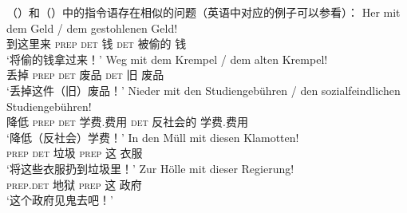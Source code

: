 \begin{exe}
\begin{xlist}[iv.]
\begin{exe}
\begin{xlist}[iv.]
（）和（）中的指令语存在相似的问题（英语中对应的例子可以参看）：
\eal
\label{Beispiel-Direktiva}
\ex 
\gll Her  mit  dem Geld   / dem gestohlenen Geld!\\
     到这里来 \textsc{prep} \textsc{det} 钱 {} \textsc{det} 被偷的 钱\\
\glt `将偷的钱拿过来！'
\ex 
\gll Weg  mit  dem Krempel / dem alten Krempel!\\
     丢掉 \textsc{prep} \textsc{det} 废品   {} \textsc{det} 旧 废品\\
\glt `丢掉这件（旧）废品！'
\ex 
\gll Nieder mit den Studiengebühren / den sozialfeindlichen Studiengebühren!\\
     降低 \textsc{prep} \textsc{det} 学费.费用  {} \textsc{det} 反社会的 学费.费用\\
\glt `降低（反社会）学费！'
\zl
\eal
\ex 
\gll In den Müll mit diesen Klamotten!\\
     \textsc{prep} \textsc{det} 垃圾 \textsc{prep} 这 衣服\\
\glt `将这些衣服扔到垃圾里！'
\ex 
\gll Zur Hölle mit dieser Regierung!\\
	 \textsc{prep}.\textsc{det} 地狱 \textsc{prep} 这 政府\\
\glt `这个政府见鬼去吧！'

\end{xlist}
\end{exe}
\end{xlist}
\end{exe}
